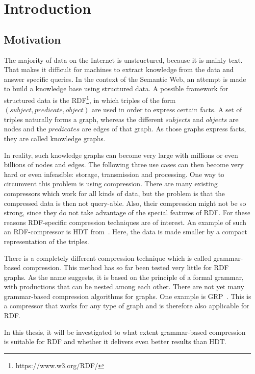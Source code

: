 \chapter{Introduction}\label{ch:introduction}

\section{Motivation}
The majority of data on the Internet is unstructured, because it is mainly text. That makes it difficult for machines to extract knowledge from the data and answer specific queries. In the context of the Semantic Web, an attempt is made to build a knowledge base using structured data. A possible framework for structured data is the \ac{RDF}\footnote{https://www.w3.org/RDF/}, in which triples of the form $ (subject, predicate, object) $ are used in order to express certain facts. A set of triples naturally forms a graph, whereas the different $subjects$ and $objects$ are nodes and the $predicates$ are edges of that graph. As those graphs express facts, they are called knowledge graphs.

In reality, such knowledge graphs can become very large with millions or even billions of nodes and edges. The following three use cases can then become very hard or even infeasible: storage, transmission and processing. One way to circumvent this problem is using compression. There are many existing compressors which work for all kinds of data, but the problem is that the compressed data is then not query-able. Also, their compression might not be so strong, since they do not take advantage of the special features of RDF. For these reasons RDF-specific compression techniques are of interest. An example of such an RDF-compressor is \ac{HDT} from~\cite{hdt}. Here, the data is made smaller by a compact representation of the triples. 

There is a completely different compression technique which is called grammar-based compression. This method has so far been tested very little for RDF graphs. As the name suggests, it is based on the principle of a formal grammar, with productions that can be nested among each other. There are not yet many grammar-based compression algorithms for graphs. One example is \ac{GRP}~\cite{maneth}. This is a compressor that works for any type of graph and is therefore also applicable for RDF.

In this thesis, it will be investigated to what extent grammar-based compression is suitable for RDF and whether it delivers even better results than HDT.


